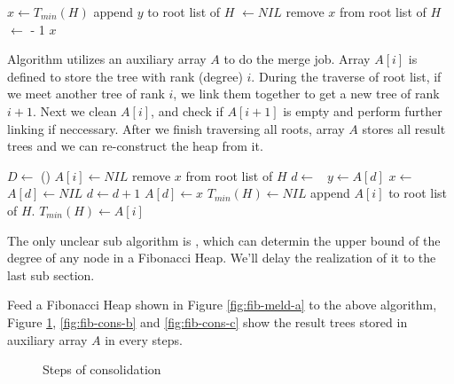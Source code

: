 \documentclass{article}
\begin{document}
\begin{algorithmic}
  \State $x \gets T_{min}(H)$
      \State append $y$ to root list of $H$
      \State {} $\gets NIL$
    \EndFor
    \State remove $x$ from root list of $H$
    \State {} $\gets$  - 1
    \State {}
  \EndIf
  \State \Return $x$
\EndFunction
\end{algorithmic}

Algorithm  utilizes an auxiliary array $A$ to do the 
merge job. Array $A[i]$ is defined to store the tree with rank (degree) $i$.
During the traverse of root list, if we meet another tree of rank $i$, we 
link them together to get a new tree of rank $i+1$. Next we clean $A[i]$, 
and check if $A[i+1]$ is empty and perform further linking if neccessary.
After we finish traversing all roots, array $A$ stores all result trees
and we can re-construct the heap from it.

\begin{algorithmic}
  \State $D \gets $ ()
    \State $A[i] \gets NIL$
  \EndFor
    \State remove $x$ from root list of $H$
    \State $d \gets $ 
    \
      \State $y \gets A[d]$
      \State $x \gets $ 
      \State $A[d] \gets NIL$
      \State $d \gets d + 1$
    \EndWhile
    \State $A[d] \gets x$
  \EndFor
  \State $T_{min}(H) \gets NIL$ 
  \For{$i \gets 0$ to $D$}
      \State append $A[i]$ to root list of $H$.
        \State $T_{min}(H) \gets A[i]$
      \EndIf
    \EndIf
  \EndFor
\EndFunction
\end{algorithmic}

The only unclear sub algorithm is , which can determin
the upper bound of the degree of any node in a Fibonacci Heap. We'll delay 
the realization of it to the last sub section.

Feed a Fibonacci Heap shown in Figure \ref{fig:fib-meld-a} to the above algorithm,
Figure \ref{fig:fib-cons-a}, \ref{fig:fib-cons-b} and \ref{fig:fib-cons-c}
show the result trees stored in auxiliary array $A$ in every steps.

\begin{figure}[htbp]
  \centering
  \subfloat[Step 4]{\texttt{[image: img/fib-cons-04.ps]}}
  \caption{Steps of consolidation} \label{fig:fib-cons-a}
\end{figure}
\end{document}
